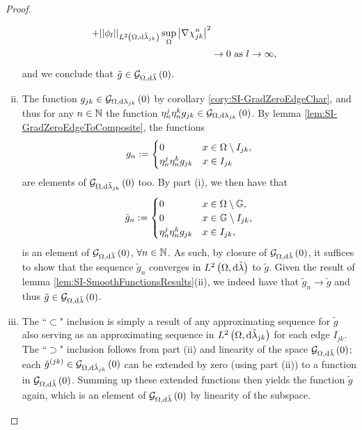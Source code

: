 \begin{proof}
\begin{enumerate}[(i)]
\begin{align*}
			+ \lvert\lvert \phi_l \rvert\rvert_{L^{2}\left( \Omega,\mathrm{d}\tilde{\lambda}_{jk} \right)} \sup_{\Omega}\left\lvert \nabla\chi_{jk}^n \right\rvert^2 \\
			&\rightarrow 0 \ \text{as} \ l \rightarrow\infty,
		\end{align*}
		and we conclude that $\tilde{g}\in\mathcal{G}_{ \Omega, \mathrm{d}\tilde{\lambda}}\left( 0 \right)$.
		\item The function $g_{jk}\in\mathcal{G}_{ \Omega, \mathrm{d}\lambda_{jk}}\left( 0 \right)$ by corollary \ref{cory:SI-GradZeroEdgeChar}, and thus for any $n\in\mathbb{N}$ the function $\eta_n^j\eta_n^k g_{jk}\in\mathcal{G}_{ \Omega, \mathrm{d}\lambda_{jk}}\left( 0 \right)$.
		By lemma \ref{lem:SI-GradZeroEdgeToComposite}, the functions
		\begin{align*}
			g_n := \begin{cases} 0 & x\in\Omega\setminus I_{jk}, \\ \eta_n^j\eta_n^k g_{jk} & x\in I_{jk} \end{cases}
		\end{align*}
		are elements of $\mathcal{G}_{ \Omega, \mathrm{d}\tilde{\lambda}_{jk}}\left( 0 \right)$ too.
		By part (i), we then have that
		\begin{align*}
			\tilde{g}_n := 	\begin{cases} 0 & x\in\Omega\setminus\mathbb{G}, \\ 0 & x\in\mathbb{G}\setminus I_{jk}, \\ \eta_n^j\eta_n^k g_{jk} & x\in I_{jk}, \end{cases}
		\end{align*}
		is an element of $\mathcal{G}_{ \Omega, \mathrm{d}\tilde{\lambda}}\left( 0 \right)$, $\forall n\in\mathbb{N}$.
		As such, by closure of $\mathcal{G}_{ \Omega, \mathrm{d}\tilde{\lambda}}\left( 0 \right)$, it suffices to show that the sequence $\tilde{g}_n$ converges in $L^{2}\left( \Omega,\mathrm{d}\tilde{\lambda} \right)$ to $\tilde{g}$.
		Given the result of lemma \ref{lem:SI-SmoothFunctionsResults}(ii), we indeed have that $\tilde{g}_n\rightarrow\tilde{g}$ and thus $\tilde{g}\in\mathcal{G}_{ \Omega, \mathrm{d}\tilde{\lambda}}\left( 0 \right)$.
		\item The ``$\subset$" inclusion is simply a result of any approximating sequence for $\tilde{g}$ also serving as an approximating sequence in $L^{2}\left( \Omega,\mathrm{d}\tilde{\lambda}_{jk} \right)$ for each edge $I_{jk}$. \newline
		The ``$\supset$" inclusion follows from part (ii) and linearity of the space $\mathcal{G}_{ \Omega, \mathrm{d}\tilde{\lambda}}\left( 0 \right)$; each $\tilde{g}^{(jk)}\in\mathcal{G}_{ \Omega, \mathrm{d}\tilde{\lambda}_{jk}}\left( 0 \right)$ can be extended by zero (using part (ii)) to a function in $\mathcal{G}_{ \Omega, \mathrm{d}\tilde{\lambda}}\left( 0 \right)$.
		Summing up these extended functions then yields the function $\tilde{g}$ again, which is an element of $\mathcal{G}_{ \Omega, \mathrm{d}\tilde{\lambda}}\left( 0 \right)$ by linearity of the subspace.
	\end{enumerate}
\end{proof}

